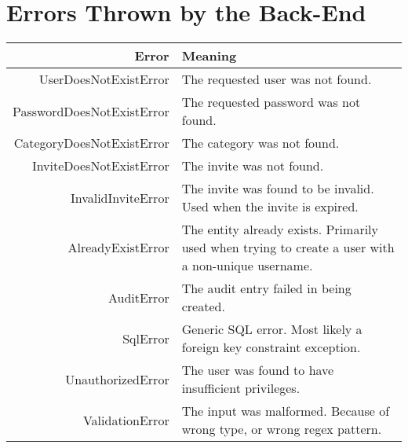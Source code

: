 \chapter{Errors Thrown by the Back-End}
\label{appendix:errors:backend}
	
	\begin{tabularx}{\textwidth}{ R{0.40} | L{0.60} }
		\textbf{Error} 					& \textbf{Meaning} \\
		\hline
		UserDoesNotExistError 			& The requested user was not found.	\\
		PasswordDoesNotExistError 		& The requested password was not found.	\\
		CategoryDoesNotExistError 		& The category was not found.	\\
		InviteDoesNotExistError 		& The invite was not found.	\\
		InvalidInviteError 				& The invite was found to be invalid. Used when the invite is expired.	\\
		AlreadyExistError 				& The entity already exists. Primarily used when trying to create a user with a non-unique username.	\\
		AuditError 						& The audit entry failed in being created.	\\
		SqlError 						& Generic SQL error. Most likely a foreign key constraint exception.	\\
		UnauthorizedError 				& The user was found to have insufficient privileges.	\\
		ValidationError 				& The input was malformed. Because of wrong type, or wrong regex pattern.	\\
	\end{tabularx}
